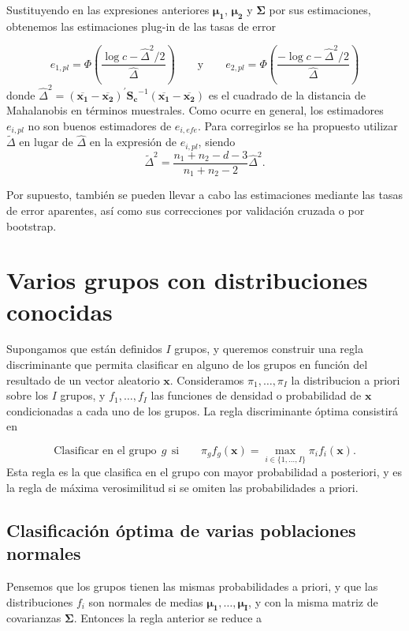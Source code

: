 \documentclass[
  a4paper,
  oneside]{scrbook}
\theoremstyle{definition}
\theoremstyle{definition}
\theoremstyle{definition}
\theoremstyle{definition}
\theoremstyle{remark}
\begin{document}
Sustituyendo en las expresiones anteriores \(\bm{\mu_1}\), \(\bm{\mu_2}\) y
\(\bm\Sigma\) por sus estimaciones, obtenemos las estimaciones plug-in de
las tasas de error

\[e_{1,pl}=\Phi\left( \frac{\log c - \hat{\Delta}^2/2}{\hat{\Delta}} \right)
\qquad\mbox{y}\qquad
e_{2,pl}=\Phi\left( \frac{-\log c - \hat{\Delta}^2/2}{\hat{\Delta}} \right)\]
donde
\(\hat{\Delta}^2=\left(\overline{\bm{x_1}}-\overline{\bm{x_2}}\right)^\prime{} \bm{S_c}^{-1} \left(\overline{\bm{x_1}}-\overline{\bm{x_2}}\right)\)
es el cuadrado de la distancia de Mahalanobis en términos muestrales.
Como ocurre en general, los estimadores \(e_{i,pl}\) no son buenos
estimadores de \(e_{i,efe}\). Para corregirlos se ha propuesto utilizar
\(\tilde{\Delta}\) en lugar de \(\hat{\Delta}\) en la expresión de
\(e_{i,pl}\), siendo
\[\tilde{\Delta}^2=\frac{n_1+n_2-d-3}{n_1+n_2-2} \hat{\Delta}^2.\]

Por supuesto, también se pueden llevar a cabo las estimaciones mediante
las tasas de error aparentes, así como sus correcciones por validación
cruzada o por bootstrap.

\section{Varios grupos con distribuciones conocidas}\label{varios-grupos-con-distribuciones-conocidas}

Supongamos que están definidos \(I\) grupos, y queremos construir una
regla discriminante que permita clasificar en alguno de los grupos en
función del resultado de un vector aleatorio \(\bm{x}\). Consideramos
\(\pi_1,\ldots,\pi_I\) la distribucion a priori sobre los \(I\) grupos, y
\(f_1,\ldots,f_I\) las funciones de densidad o probabilidad de \(\bm{x}\)
condicionadas a cada uno de los grupos. La regla discriminante óptima
consistirá en

\[\mbox{Clasificar en el grupo}\ \  g \ \ \mbox{si}\qquad \pi_g f_g(\bm{x})=\max_{i\in\{1,\ldots,I\}} \pi_i f_i(\bm{x}).\] Esta regla es la que clasifica en el grupo con
mayor probabilidad a posteriori, y es la regla de máxima verosimilitud
si se omiten las probabilidades a priori.

\subsection{Clasificación óptima de varias poblaciones normales}\label{clasificacion-optima-de-varias-poblaciones-normales}

Pensemos que los grupos tienen las mismas probabilidades a priori, y que
las distribuciones \(f_i\) son normales de medias
\(\bm{\mu_1},\ldots,\bm{\mu_I}\), y con la misma matriz de covarianzas
\(\bm\Sigma\). Entonces la regla anterior se reduce a
\end{document}
